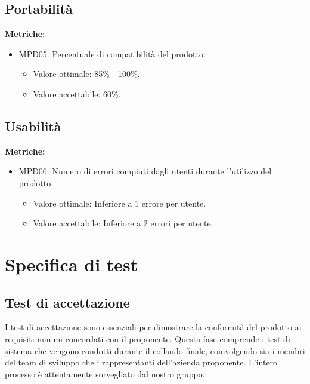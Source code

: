 \documentclass[12pt]{article}
\begin{document}
\subsection{Portabilità}
\textbf{Metriche}:
\begin{itemize}
	\item MPD05: Percentuale di compatibilità del prodotto.
	      \begin{itemize}
		      \item Valore ottimale: 85\% - 100\%.
		      \item Valore accettabile: 60\%.
	      \end{itemize}
\end{itemize}


\subsection{Usabilità}
\textbf{Metriche:}
\begin{itemize}
	\item MPD06: Numero di errori compiuti dagli utenti durante l'utilizzo del prodotto.
	      \begin{itemize}
		      \item Valore ottimale: Inferiore a 1 errore per utente.
		      \item Valore accettabile: Inferiore a 2 errori per utente.
	      \end{itemize}
\end{itemize}


\section{Specifica di test}
\subsection{Test di accettazione}
I test di accettazione sono essenziali per dimostrare la conformità del prodotto ai requisiti minimi concordati con il proponente. Questa fase comprende i test di sistema che vengono condotti durante il collaudo finale, coinvolgendo sia i membri del team di sviluppo che i rappresentanti dell'azienda proponente. L'intero processo è attentamente sorvegliato dal nostro gruppo.
\end{document}
